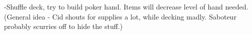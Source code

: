 \documentclass[green]{airship}
\begin{document}
\name{\gBomb{}}

-Shuffle deck, try to build poker hand. Items will decrease level of hand needed. (General idea - Cid shouts for supplies a lot, while decking madly. Saboteur probably scurries off to hide the stuff.)
\end{document}
